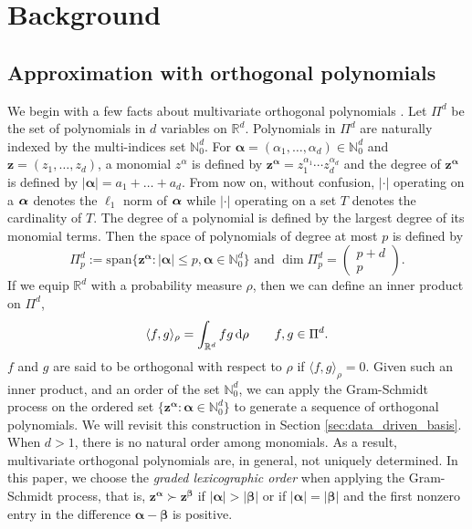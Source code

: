 \section{Background} \label{sec:prelim}

\subsection{Approximation with orthogonal polynomials} \label{sec:aPE}

We begin with a few facts about multivariate orthogonal polynomials \cite{dunkl_xu_2014}. 
Let $\Pi^d$ be the set of polynomials in $d$ variables on $\mathbb{R}^d$.
Polynomials in $\Pi^d$ are naturally indexed by the multi-indices set $\mathbb{N}_0^d$.
For $\bm{\alpha} = (\alpha_1,\dots,\alpha_d)\in \mathbb{N}_0^d$ and $\bm{z} = (z_1,\dots,z_d)$, a monomial $z^\alpha$ is defined by $\bm{z}^{\bm{\alpha}} = z_1^{\alpha_1}\cdots z_d^{\alpha_d}$ and the degree of $\bm{z}^{\bm{\alpha}}$ is defined by $|\bm{\alpha}| = a_1+\dots+a_d$. From now on, without confusion, $|\cdot|$ operating on a  $\bm\alpha$ denotes the $\ell_1$ norm of $\bm\alpha$ while $|\cdot|$ operating on a set $T$ denotes the cardinality of $T$.
The degree of a polynomial is defined by the largest degree of its monomial terms.
Then the space of polynomials of degree at most $p$ is defined by
\begin{equation}\label{def:P_n^d}
    \Pi_p^d :=  \textrm{span}\{\bm{z}^{\bm{\alpha}}:|\bm{\alpha}|\leq p, \bm{\alpha} \in \mathbb{N}_0^d \}
    \textrm{ and }
    \dim \Pi_p^d = \left(\begin{array}{c} p+d\\ p\end{array}\right).
\end{equation} 
If we equip $\mathbb{R}^d$ with a probability measure $\rho$, then we can define an inner product on $\Pi^d$,
\begin{equation} \label{def:inner_prod}
    \langle f,g \rangle_{\rho} = \int_{\mathbb{R}^d} f g \,\mathrm{d} \rho \qquad f,g\in \Pi^d.
\end{equation}
$f$ and $g$ are said to be orthogonal with respect to $\rho$ if $\langle f,g \rangle_{\rho} = 0$.
Given such an inner product, and an order of the set $\mathbb{N}_0^d$, we can apply the Gram-Schmidt process on the ordered set $\{\bm{z}^{\bm{\alpha}}:\bm{\alpha}\in \mathbb{N}_0^d\}$ to generate a sequence of orthogonal polynomials.
We will revisit this construction in Section \ref{sec:data_driven_basis}.
When $d>1$, there is no natural order among monomials.
As a result, multivariate orthogonal polynomials are, in general, not uniquely determined.
In this paper, we choose the \emph{graded lexicographic order} when applying the Gram-Schmidt process, that is, $\bm{z}^{\bm{\alpha}}\succ \bm{z}^{\bm{\beta}}$ if $|\bm{\alpha}|>|\bm{\beta}|$ or if $|\bm{\alpha}| = |\bm{\beta}|$ and the first nonzero entry in the difference $\bm{\alpha}-\bm{\beta}$ is positive. 

